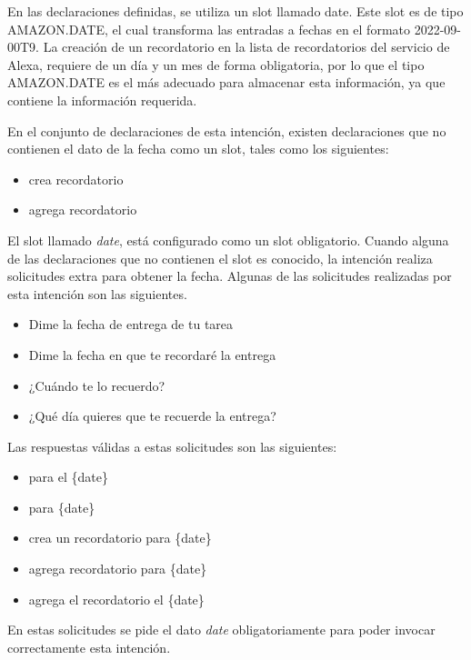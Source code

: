 En las declaraciones definidas, se utiliza un slot llamado date. Este slot es de tipo AMAZON.DATE, el cual transforma las entradas a fechas en el formato 2022-09-00T9. La creación de un recordatorio en la lista de recordatorios del servicio de Alexa, requiere de un día y un mes de forma obligatoria, por lo que el tipo AMAZON.DATE es el más adecuado para almacenar esta información, ya que contiene la información requerida.

En el conjunto de declaraciones de esta intención, existen declaraciones que no contienen el dato de la fecha como un slot, tales como los siguientes:

\begin{itemize}
  \item crea recordatorio
  \item agrega recordatorio
\end{itemize}

El slot llamado \textit{date}, está configurado como un slot obligatorio. Cuando alguna de las declaraciones que no contienen el slot es conocido, la intención realiza solicitudes extra para obtener la fecha. Algunas de las solicitudes realizadas por esta intención son las siguientes.

\begin{itemize}
  \item Dime la fecha de entrega de tu tarea
  \item Dime la fecha en que te recordaré la entrega
  \item ¿Cuándo te lo recuerdo?
  \item ¿Qué día quieres que te recuerde la entrega?
\end{itemize}

Las respuestas válidas a estas solicitudes son las siguientes:

\begin{itemize}
  \item para el \{date\}
  \item para \{date\}
  \item crea un recordatorio para \{date\}
  \item agrega recordatorio para \{date\}
  \item agrega el recordatorio el \{date\}
\end{itemize}

En estas solicitudes se pide el dato \textit{date} obligatoriamente para poder invocar correctamente esta intención.


